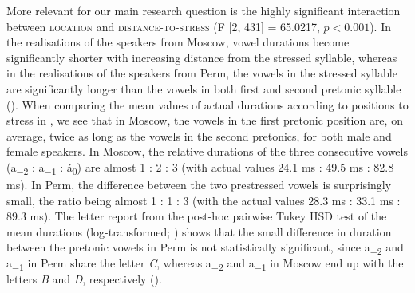 \documentclass[output=paper]{langscibook}
\begin{document}
More relevant for our main research question is the highly significant interaction between \textsc{location} and \textsc{distance-to-stress} (F [2, 431] = 65.0217, $p < 0.001$). In the realisations of the speakers from Moscow, vowel durations become significantly shorter with increasing distance from the stressed syllable, whereas in the realisations of the speakers from Perm, the vowels in the stressed syllable are significantly longer than the vowels in both first and second pretonic syllable (). When comparing the mean values of actual durations according to positions to stress in , we see that in Moscow, the vowels in the first pretonic position are, on average, twice as long as the vowels in the second pretonics, for both male and female speakers. In Moscow, the relative durations of the three consecutive vowels (a\textsubscript{$-2$} : a\textsubscript{$-1$} : á\textsubscript{0}) are almost 1 : 2 : 3 (with actual values 24.1 ms : 49.5 ms : 82.8 ms). In Perm, the difference between the two prestressed vowels is surprisingly small, the ratio being almost 1 : 1 : 3 (with the actual values 28.3 ms : 33.1 ms : 89.3 ms). The letter report from the post-hoc pairwise Tukey HSD test of the mean durations (log-transformed; ) shows that the small difference in duration between the pretonic vowels in Perm is not statistically significant, since a\textsubscript{$-2$} and a\textsubscript{$-1$} in Perm share the letter \textit{C}, whereas a\textsubscript{$-2$} and a\textsubscript{$-1$} in Moscow end up with the letters \textit{B} and \textit{D}, respectively ().
\end{document}
